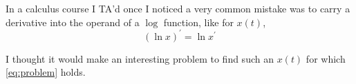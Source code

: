 \documentclass[12pt]{article}
\begin{document}
In a calculus course I TA'd once I noticed a very common mistake was to carry a derivative into the operand of a $\log$ function, like for $x(t)$,
\begin{equation}
(\ln x)^\prime = \ln x^\prime \tag{*}
\label{eq:problem}
\end{equation}

I thought it would make an interesting problem to find such an $x(t)$ for which \eqref{eq:problem} holds.
\end{document}

